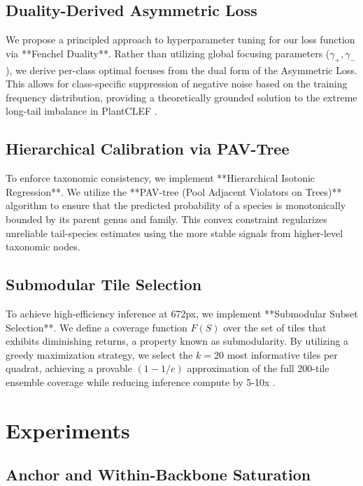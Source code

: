 \documentclass[10pt,twocolumn,letterpaper]{article}
\begin{document}
\subsection{Duality-Derived Asymmetric Loss}
We propose a principled approach to hyperparameter tuning for our loss function via **Fenchel Duality**. Rather than utilizing global focusing parameters ($\gamma_+, \gamma_-$), we derive per-class optimal focuses from the dual form of the Asymmetric Loss. This allows for class-specific suppression of negative noise based on the training frequency distribution, providing a theoretically grounded solution to the extreme long-tail imbalance in PlantCLEF \cite{duo_focal}.

\subsection{Hierarchical Calibration via PAV-Tree}
To enforce taxonomic consistency, we implement **Hierarchical Isotonic Regression**. We utilize the **PAV-tree (Pool Adjacent Violators on Trees)** algorithm \cite{hierarchical_calib} to ensure that the predicted probability of a species is monotonically bounded by its parent genus and family. This convex constraint regularizes unreliable tail-species estimates using the more stable signals from higher-level taxonomic nodes.

\subsection{Submodular Tile Selection}
To achieve high-efficiency inference at 672px, we implement **Submodular Subset Selection**. We define a coverage function $F(S)$ over the set of tiles that exhibits diminishing returns, a property known as submodularity. By utilizing a greedy maximization strategy, we select the $k=20$ most informative tiles per quadrat, achieving a provable $(1 - 1/e)$ approximation of the full 200-tile ensemble coverage while reducing inference compute by 5-10x \cite{submodular_vision}.

\section{Experiments}
\label{sec:experiments}

\subsection{Anchor and Within-Backbone Saturation}
\end{document}
